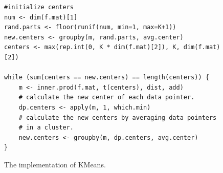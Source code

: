 \begin{figure}[t]
\begin{verbatim}
#initialize centers
num <- dim(f.mat)[1]
rand.parts <- floor(runif(num, min=1, max=K+1))
new.centers <- groupby(m, rand.parts, avg.center)
centers <- max(rep.int(0, K * dim(f.mat)[2]), K, dim(f.mat)[2])

while (sum(centers == new.centers) == length(centers)) {
    m <- inner.prod(f.mat, t(centers), dist, add)
    # calculate the new center of each data pointer.
    dp.centers <- apply(m, 1, which.min)
    # calculate the new centers by averaging data pointers
	# in a cluster.
    new.centers <- groupby(m, dp.centers, avg.center)
}
\end{verbatim}
\vspace{-5pt}
\caption{The implementation of KMeans.}
\label{fig:kmeans}
\end{figure}

